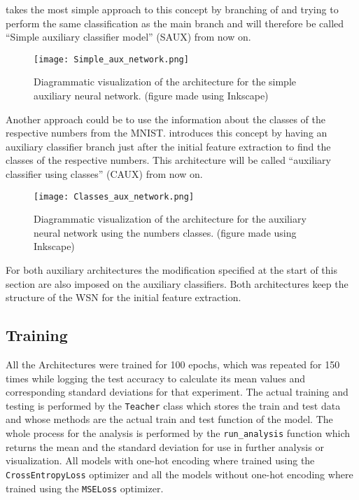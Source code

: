\documentclass[11pt,english]{article}
\begin{document}
	 takes the most simple approach to this concept by branching of and trying to perform the same classification as the main branch and will therefore be called ``Simple auxiliary classifier model'' (SAUX) from now on.
	
	\begin{figure}[H]
		\centering
		\texttt{[image: Simple\_aux\_network.png]}
		\caption{Diagrammatic visualization of the architecture for the simple auxiliary neural network. (figure made using Inkscape)}
		\label{fig:saux}
	\end{figure}
	
	Another approach could be to use the information about the classes of the respective numbers from the MNIST.  introduces this concept by having an auxiliary classifier branch just after the initial feature extraction to find the classes of the respective numbers. This architecture will be called ``auxiliary classifier using classes'' (CAUX) from now on.
	
	\begin{figure}[H]
		\centering
		\texttt{[image: Classes\_aux\_network.png]}
		\caption{Diagrammatic visualization of the architecture for the auxiliary neural network using the numbers classes. (figure made using Inkscape)}
		\label{fig:caux}
	\end{figure}

	For both auxiliary architectures the modification specified at the start of this section are also imposed on the auxiliary classifiers. Both architectures keep the structure of the WSN for the initial feature extraction.
	
	\subsection{Training}
	
	All the Architectures were trained for 100 epochs, which was repeated for 150 times while logging the test accuracy to calculate its mean values and corresponding standard deviations for that experiment. The actual training and testing is performed by the \lstinline|Teacher| class which stores the train and test data and whose methods are the actual train and test function of the model. The whole process for the analysis is performed by the \lstinline|run_analysis| function which returns the mean and the standard deviation for use in further analysis or visualization. All models with one-hot encoding where trained using the \lstinline|CrossEntropyLoss| optimizer and all the models without one-hot encoding where trained using the \lstinline|MSELoss| optimizer.
	
\end{document}
